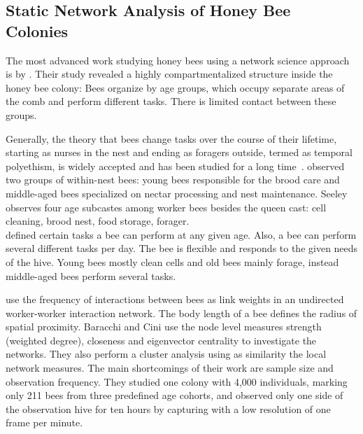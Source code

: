 \subsection{Static Network Analysis of Honey Bee Colonies}

The most advanced work studying honey bees using a network science approach is by \textcite{baracchi2014socio}.
Their study revealed a highly compartmentalized structure inside the honey bee colony:
Bees organize by age groups, which occupy separate areas of the comb and perform different tasks.
There is limited contact between these groups.

Generally, the theory that bees change tasks over the course of their lifetime, starting as nurses in the nest and ending as foragers outside, termed as temporal polyethism,  is widely accepted and has been studied for a long time~\cite{seeley1982adaptive, johnson2008within, lindauer1952beitrag}.
\textcite{johnson2008within} observed two groups of within-nest bees: young bees responsible for the brood care and middle-aged bees specialized on nectar processing and nest maintenance.
Seeley~\cite{seeley1982adaptive} observes four age subcastes among worker bees besides the queen cast: cell cleaning, brood nest, food storage, forager.\\
\textcite{lindauer1952beitrag} defined certain tasks a bee can perform at any given age. Also, a bee can perform several different tasks per day. The bee is flexible and responds to the given needs of the hive. Young bees mostly clean cells and old bees mainly forage, instead middle-aged bees perform several tasks.~\cite{lindauer1952beitrag}

\textcite{baracchi2014socio} use the frequency of interactions between bees as link weights in an undirected worker-worker interaction network.
The body length of a bee defines the radius of spatial proximity.
Baracchi and Cini use the node level measures strength (weighted degree), closeness and eigenvector centrality to investigate the networks.
They also perform a cluster analysis using as similarity the local network measures.
The main shortcomings of their work are sample size and observation frequency. They studied one colony with 4,000 individuals, marking only 211 bees from three predefined age cohorts, and observed only one side of the observation hive for ten hours by capturing with a low resolution of one frame per minute.

